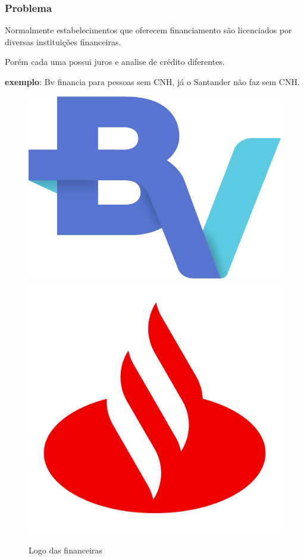\documentclass[12pt]{beamer}
\begin{document}
\begin{frame}
    \frametitle{Problema}

    Normalmente estabelecimentos que oferecem financiamento são licenciados por diversas instituições financeiras.

    Porém cada uma possui juros e analise de crédito diferentes.

    \textbf{exemplo}:
    Bv financia para pessoas sem CNH, já o Santander não faz sem CNH\@.
    \begin{figure}
        \centering
        \includegraphics[height=.25\textheight]{BV-financeira-logo.png}
        \includegraphics[height=.29\textheight]{logo-santander-icon-4096.png}
        \caption{Logo das financeiras}
    \end{figure}
\end{frame}
\end{document}
